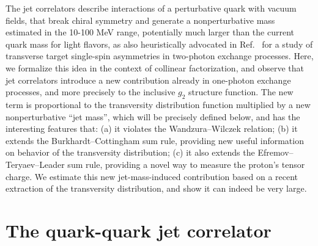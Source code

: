 \documentclass[preprintnumbers,floatfix,nofootinbib]{revtex4}
\begin{document}
The jet correlators describe interactions of a perturbative quark with vacuum fields, that break chiral symmetry and generate a nonperturbative mass
estimated in the 10-100 MeV range, potentially
much larger than the current quark mass for light flavors, as also heuristically advocated in Ref.~\cite{Afanasev:2007ii} for a study of transverse target single-spin asymmetries in two-photon exchange processes. Here, we formalize this idea in the context of collinear factorization, and observe that jet correlators introduce a new
contribution already in one-photon exchange processes, and more precisely to the inclusive $g_2$ structure function. The new term is proportional to the transversity distribution function multiplied by a new nonperturbative ``jet mass'', which will be precisely defined below, and has the interesting features that:
(a) it violates the Wandzura--Wilczek relation;
(b) it extends the Burkhardt--Cottingham sum rule, providing new useful information on behavior of the transversity distribution;
(c) it also extends the Efremov--Teryaev--Leader sum rule, providing a novel way to measure the proton's tensor charge.
We estimate this new jet-mass-induced contribution based on a recent extraction of the transversity distribution, and show it can indeed be very large.   
 

\section{The quark-quark jet correlator}
\end{document}
